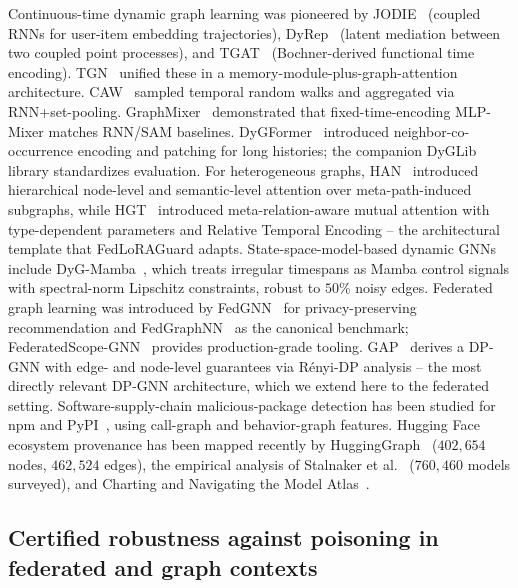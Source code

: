 \documentclass[12pt,a4paper]{article}
\theoremstyle{definition}
\theoremstyle{remark}
\newcommand{\modelname}{FedLoRAGuard}
\begin{document}
Continuous-time dynamic graph learning was pioneered by JODIE~\cite{kumar2019jodie} (coupled RNNs for user-item embedding trajectories), DyRep~\cite{trivedi2019dyrep} (latent mediation between two coupled point processes), and TGAT~\cite{xu2020tgat} (Bochner-derived functional time encoding). TGN~\cite{rossi2020tgn} unified these in a memory-module-plus-graph-attention architecture. CAW~\cite{wang2021caw} sampled temporal random walks and aggregated via RNN+set-pooling. GraphMixer~\cite{cong2023graphmixer} demonstrated that fixed-time-encoding MLP-Mixer matches RNN/SAM baselines. DyGFormer~\cite{yu2023dygformer} introduced neighbor-co-occurrence encoding and patching for long histories; the companion DyGLib library standardizes evaluation. For heterogeneous graphs, HAN~\cite{wang2019han} introduced hierarchical node-level and semantic-level attention over meta-path-induced subgraphs, while HGT~\cite{hu2020hgt} introduced meta-relation-aware mutual attention with type-dependent parameters and Relative Temporal Encoding -- the architectural template that \modelname{} adapts. State-space-model-based dynamic GNNs include DyG-Mamba~\cite{li2025dygmamba}, which treats irregular timespans as Mamba control signals with spectral-norm Lipschitz constraints, robust to $50\%$ noisy edges. Federated graph learning was introduced by FedGNN~\cite{wu2022fedgnn} for privacy-preserving recommendation and FedGraphNN~\cite{he2021fedgraphnn} as the canonical benchmark; FederatedScope-GNN~\cite{wang2022fsgnn} provides production-grade tooling. GAP~\cite{sajadmanesh2023gap} derives a DP-GNN with edge- and node-level guarantees via R\'enyi-DP analysis -- the most directly relevant DP-GNN architecture, which we extend here to the federated setting. Software-supply-chain malicious-package detection has been studied for npm and PyPI~\cite{sejfia2022amalfi,duan2021maloss,zhang2024spiderscan}, using call-graph and behavior-graph features. Hugging Face ecosystem provenance has been mapped recently by HuggingGraph~\cite{rahman2025hugginggraph} ($402{,}654$ nodes, $462{,}524$ edges), the empirical analysis of Stalnaker et al.~\cite{stalnaker2025empirical} ($760{,}460$ models surveyed), and Charting and Navigating the Model Atlas~\cite{horwitz2025atlas}.

\subsection{Certified robustness against poisoning in federated and graph contexts}
\end{document}
